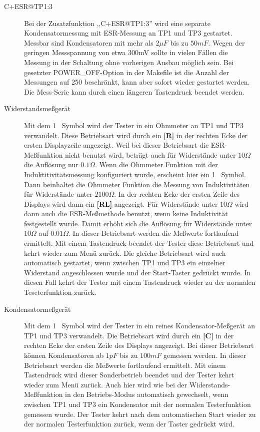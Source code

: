 \begin{description}
 \item[C+ESR@TP1:3]
Bei der Zusatzfunktion ,,C+ESR@TP1:3'' wird eine separate Kondensatormessung mit ESR-Messung an TP1 und TP3 gestartet.
Messbar sind Kondensatoren mit mehr als \(2\mu F\) bis zu \(50mF\). Wegen der geringen Messspannung von etwa 300mV sollte
in vielen Fällen die Messung in der Schaltung ohne vorherigen Ausbau möglich sein.
Bei gesetzter POWER\_OFF-Option in der Makefile ist die Anzahl der Messungen auf 250 beschränkt,
kann aber sofort wieder gestartet werden.
Die Mess-Serie kann durch einen längeren Tastendruck beendet werden.\\

 \item[Widerstandsmeßgerät]
Mit dem \mbox{1 } Symbol wird der Tester in ein Ohmmeter an TP1 und TP3 verwandelt. Diese Betriebsart wird durch
ein {\bf[R]} in der rechten Ecke der ersten Displayzeile angezeigt. Weil bei dieser Betriebsart die
ESR-Meßfunktion nicht benutzt wird, beträgt auch für Widerstände unter \(10\Omega\) die Auflösung
nur \(0.1\Omega\). Wenn die Ohmmeter Funktion mit der Induktitivitätsmessung konfiguriert wurde,
erscheint hier ein \mbox{1 \electricR {}} Symbol.
Dann beinhaltet die Ohmmeter Funktion die Messung von Induktivitäten für Widerstände unter \(2100\Omega\). 
In der rechten Ecke der ersten Zeile des Displays wird dann ein {\bf[RL]} angezeigt.
Für Widerstände unter \(10\Omega\) wird dann auch die ESR-Meßmethode benutzt,
wenn keine Induktivität festgestellt wurde. Damit erhöht sich die Auflösung für Widerstände
unter \(10\Omega\) auf \(0.01\Omega\).
In dieser Betriebsart werden die Meßwerte fortlaufend ermittelt.
Mit einem Tastendruck beendet der Tester diese Betriebsart und kehrt wieder zum Menü zurück.
Die gleiche Betriebsart wird auch automatisch gestartet, wenn zwischen TP1 und TP3 ein einzelner Widerstand
angeschlossen wurde und der Start-Taster gedrückt wurde. In diesen Fall kehrt der Tester mit einem Tastendruck 
wieder zu der normalen Teseterfunktion zurück.

 \item[Kondensatormeßgerät]
Mit dem \mbox{1 } Symbol wird der Tester
in ein reines Kondensator-Meßgerät an TP1 und TP3 verwandelt.
Die Betriebsart wird durch ein {\bf[C]} in der rechten Ecke der ersten Zeile des Displays angezeigt.
Bei dieser Betriebsart können Kondensatoren ab \(1pF\) bis zu \(100mF\) gemessen werden.
In dieser Betriebsart werden die Meßwerte fortlaufend ermittelt.
Mit einem Tastendruck wird dieser Sonderbetrieb beendet und der Tester kehrt wieder zum Menü zurück.
Auch hier wird wie bei der Widerstands-Meßfunktion in den  Betriebs-Modus automatisch gewechselt,
 wenn zwischen TP1 und TP3 ein Kondensator mit der normalen Testerfunktion gemessen wurde.
Der Tester kehrt nach dem automatischen Start wieder zu der normalen Testerfunktion zurück, wenn der Taster gedrückt wird.


\end{description}
